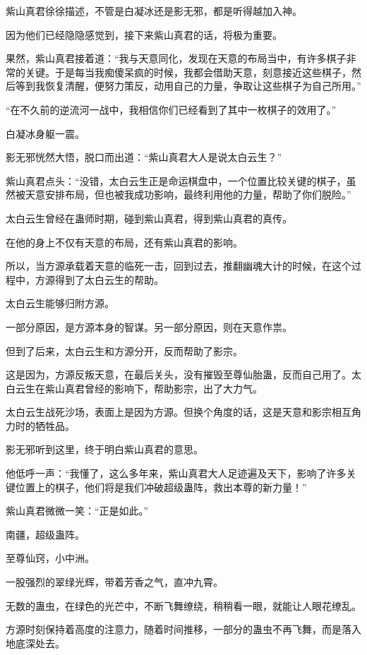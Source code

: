 \begin{this_body}
紫山真君徐徐描述，不管是白凝冰还是影无邪，都是听得越加入神。

因为他们已经隐隐感觉到，接下来紫山真君的话，将极为重要。

果然，紫山真君接着道：“我与天意同化，发现在天意的布局当中，有许多棋子非常的关键。于是每当我痴傻呆疯的时候，我都会借助天意，刻意接近这些棋子，然后等到我恢复清醒，便努力策反，动用自己的力量，争取让这些棋子为自己所用。”

“在不久前的逆流河一战中，我相信你们已经看到了其中一枚棋子的效用了。”

白凝冰身躯一震。

影无邪恍然大悟，脱口而出道：“紫山真君大人是说太白云生？”

紫山真君点头：“没错，太白云生正是命运棋盘中，一个位置比较关键的棋子，虽然被天意安排布局，但也被我成功影响，最终利用他的力量，帮助了你们脱险。”

太白云生曾经在蛊师时期，碰到紫山真君，得到紫山真君的真传。

在他的身上不仅有天意的布局，还有紫山真君的影响。

所以，当方源承载着天意的临死一击，回到过去，推翻幽魂大计的时候，在这个过程中，方源得到了太白云生的帮助。

太白云生能够归附方源。

一部分原因，是方源本身的智谋。另一部分原因，则在天意作祟。

但到了后来，太白云生和方源分开，反而帮助了影宗。

这是因为，方源反叛天意，在最后关头，没有摧毁至尊仙胎蛊，反而自己用了。太白云生在紫山真君曾经的影响下，帮助影宗，出了大力气。

太白云生战死沙场，表面上是因为方源。但换个角度的话，这是天意和影宗相互角力时的牺牲品。

影无邪听到这里，终于明白紫山真君的意思。

他低呼一声：“我懂了，这么多年来，紫山真君大人足迹遍及天下，影响了许多关键位置上的棋子，他们将是我们冲破超级蛊阵，救出本尊的新力量！”

紫山真君微微一笑：“正是如此。”

南疆，超级蛊阵。

至尊仙窍，小中洲。

一股强烈的翠绿光辉，带着芳香之气，直冲九霄。

无数的蛊虫，在绿色的光芒中，不断飞舞缭绕，稍稍看一眼，就能让人眼花缭乱。

方源时刻保持着高度的注意力，随着时间推移，一部分的蛊虫不再飞舞，而是落入地底深处去。


\end{this_body}
